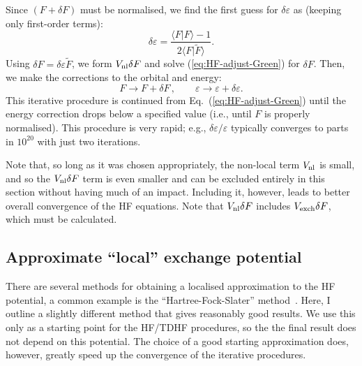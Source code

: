 \documentclass[10pt,twocolumn,a4paper]{article}%
\newcommand{\braket}[1]{\ensuremath{\langle #1\rangle}}	%
\newcommand{\be}{\begin{equation}}
\newcommand{\ee}{\end{equation}}
\def\en{\ensuremath{\varepsilon}}
\begin{document}
Since $(F+\delta F)$ must be normalised, we find the first guess for $\delta \en$ as (keeping only first-order terms):
\be
\delta \en = \frac{\braket{F|F} - 1}{2\braket{F|\tilde F}}.
\ee
Using  $\delta F = \delta\en\tilde F$, we form $V_{\rm nl} \delta F$ and solve (\ref{eq:HF-adjust-Green}) for $\delta F$.
Then, we make the corrections to the orbital and energy:
\be
F\to F+\delta F \, , \qquad \en\to\en + \delta\en.
\ee
This iterative procedure is continued from Eq.~(\ref{eq:HF-adjust-Green}) until the energy correction drops below a specified value
(i.e., until $F$ is properly normalised).
This procedure is very rapid; e.g., $\delta\en/\en$ typically converges to parts in $10^{20}$ with just two iterations.

Note that, so long as it was chosen appropriately, the non-local term $V_{\rm nl}$ is small, and so the $V_{\rm nl}\delta F$ term is even smaller and can be excluded entirely in this section without having much of an impact.
Including it, however, leads to better overall convergence of the HF equations.
Note that $V_{\rm nl} \delta F$ includes $V_{\rm exch} \delta F$, which must be calculated.







\subsection{Approximate ``local'' exchange potential}\label{sec:hf-approx}


There are several methods for obtaining a localised approximation to the HF potential, a common  example is the ``Hartree-Fock-Slater'' method~\cite{Slater1951}.
%
Here, I outline a slightly different method %
that gives reasonably good results.
We use this only as a starting point for the HF/TDHF procedures, so the the final result does not depend on this potential. 
The choice of a good starting approximation does, however, greatly speed up the convergence of the iterative procedures.
\end{document}
